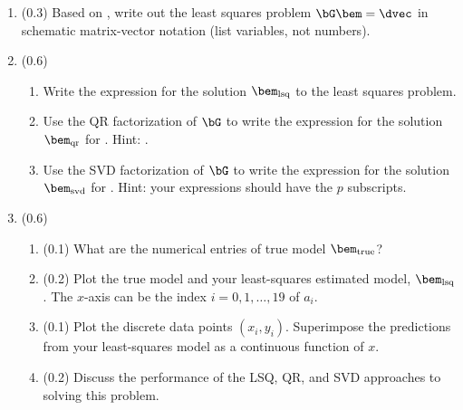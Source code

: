 \documentclass[11pt,titlepage,fleqn]{article}
\begin{document}
\begin{enumerate}
\item (0.3) Based on , write out the least squares problem $\bG\bem = \dvec$ in schematic matrix-vector notation (list variables, not numbers).


\item (0.6) 

\begin{enumerate}
\item Write the expression for the solution $\bem_{\rm lsq}$ to the least squares problem.
\item Use the QR factorization of $\bG$ to write the expression for the solution $\bem_{\rm qr}$ for \makebox{$\bG\bem = \dvec$}. Hint: \citet[][Appendix A]{Aster}.

\item Use the SVD factorization of $\bG$ to write the expression for the solution $\bem_{\rm svd}$ for \makebox{$\bG\bem = \dvec$}. Hint: your expressions should have the $p$ subscripts.
\end{enumerate}

\item (0.6)

\begin{enumerate}
\item (0.1) What are the numerical entries of true model $\bem_{\rm true}$?

\item (0.2) Plot the true model and your least-squares estimated model, $\bem_{\rm lsq}$. The $x$-axis can be the index $i = 0,1,\ldots,19$ of $a_i$.

\item (0.1) Plot the discrete data points $(x_i,y_i)$. Superimpose the predictions from your least-squares model as a continuous function of $x$.


\item (0.2) Discuss the performance of the LSQ, QR, and SVD approaches to solving this problem.

\end{enumerate}

%


\end{enumerate}
\end{document}
